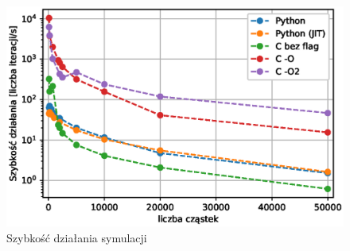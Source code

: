 \begin{figure}[h!]
  \includegraphics[width=\textwidth]{Images/speeds}
  \caption{Szybkość działania symulacji}\label{fig:runspeed}
\end{figure}
